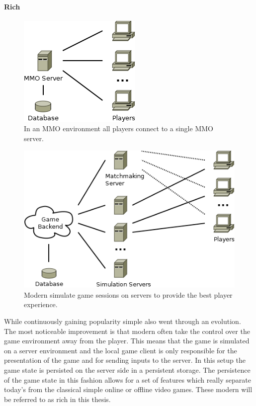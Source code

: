 \paragraph{Rich \ogs{}}

\begin{figure}
  \centering
  \includegraphics[width=.4\linewidth]{images/MMO}
  \caption{In an MMO environment all players connect to a single MMO server.}
  \label{fig:mmo}
\end{figure}
\begin{figure}
  \centering
  \includegraphics[width=.8\linewidth]{images/RichOnlineGame}
  \caption{Modern \og{} simulate game sessions on servers to provide the best
  player experience.}
  \label{fig:rich_online_game}
\end{figure}

While continuously gaining popularity simple \ogs{} also went through an
evolution. The most noticeable improvement is that modern \ogs{} often take the
control over the game environment away from the player. This means that the game
is simulated on a server environment and the local game client is only
responsible for the presentation of the game and for sending inputs to the
server. In this setup the game state is persisted on the server side in a
persistent storage. The persistence of the game state in this fashion allows for
a set of features which really separate today's \ogs{} from the classical simple
online or offline video games. These modern \ogs{} will be referred to as rich
\og{} in this thesis.

